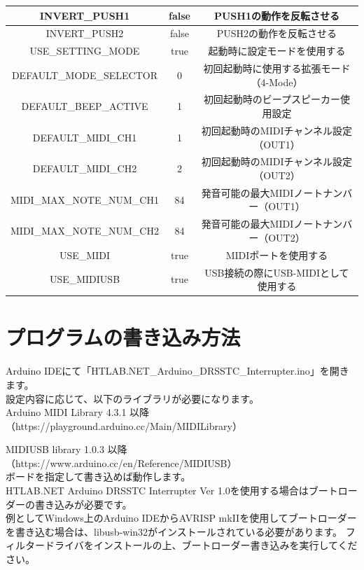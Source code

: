 \documentclass[a4paper,11pt]{jsarticle}
\begin{document}
\begin{table}[htbp]
\begin{center}
\begin{tabular}{ | c | c | c |}
INVERT\_PUSH1 & false & PUSH1の動作を反転させる \\\hline
INVERT\_PUSH2 & false & PUSH2の動作を反転させる \\\hline
USE\_SETTING\_MODE & true & 起動時に設定モードを使用する \\\hline
DEFAULT\_MODE\_SELECTOR & 0 & 初回起動時に使用する拡張モード（4-Mode） \\\hline
DEFAULT\_BEEP\_ACTIVE & 1 & 初回起動時のビープスピーカー使用設定 \\\hline
DEFAULT\_MIDI\_CH1 & 1 & 初回起動時のMIDIチャンネル設定（OUT1） \\\hline
DEFAULT\_MIDI\_CH2 & 2 & 初回起動時のMIDIチャンネル設定（OUT2） \\\hline
MIDI\_MAX\_NOTE\_NUM\_CH1 & 84 & 発音可能の最大MIDIノートナンバー（OUT1） \\\hline
MIDI\_MAX\_NOTE\_NUM\_CH2 & 84 & 発音可能の最大MIDIノートナンバー（OUT2） \\\hline
USE\_MIDI & true & MIDIポートを使用する \\\hline
USE\_MIDIUSB & true & USB接続の際にUSB-MIDIとして使用する \\\hline
\end{tabular}
\end{center}
\end{table}



\clearpage

\section{プログラムの書き込み方法}

Arduino IDEにて「HTLAB.NET\_Arduino\_DRSSTC\_Interrupter.ino」を開きます。 \\
設定内容に応じて、以下のライブラリが必要になります。 \\

Arduino MIDI Library 4.3.1 以降 
（https://playground.arduino.cc/Main/MIDILibrary）

MIDIUSB library 1.0.3 以降 
（https://www.arduino.cc/en/Reference/MIDIUSB）
\\

ボードを指定して書き込めば動作します。\\

HTLAB.NET Arduino DRSSTC Interrupter Ver 1.0を使用する場合はブートローダーの書き込みが必要です。 \\

例としてWindows上のArduino IDEからAVRISP mkIIを使用してブートローダーを書き込む場合は、libusb-win32がインストールされている必要があります。 
フィルタードライバをインストールの上、ブートローダー書き込みを実行してください。 \\
\end{document}
